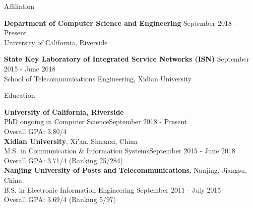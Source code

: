 \documentclass{resume} %
\begin{document}



\begin{rSection}{Affiliation}

{\bf Department of Computer Science and Engineering} \hfill {September 2018 - Present}\\
University of California, Riverside

{\bf State Key Laboratory of Integrated Service Networks (ISN)} \hfill {September 2015 - June 2018}\\
School of Telecommunications Engineering, Xidian University

\end{rSection}


\begin{rSection}{Education}

{\bf University of California, Riverside}\\
{PhD ongoing in Computer Science}\hfill {September 2018 - Present}  \\
Overall GPA: 3.80/4\\

{\bf Xidian University}, {Xi'an, Shaanxi, China}\\
{M.S. in Communication \& Information Systems}\hfill {September 2015 - June 2018}  \\
Overall GPA: 3.71/4 (Ranking 25/284)\\


{\bf Nanjing University of Posts and Telecommunications}, {Nanjing, Jiangsu, China}\\
{B.S. in Electronic Information Engineering} \hfill {September 2011 - July 2015} \\
Overall GPA: 3.69/4 (Ranking 5/97)\\

\end{rSection}

\end{document}
